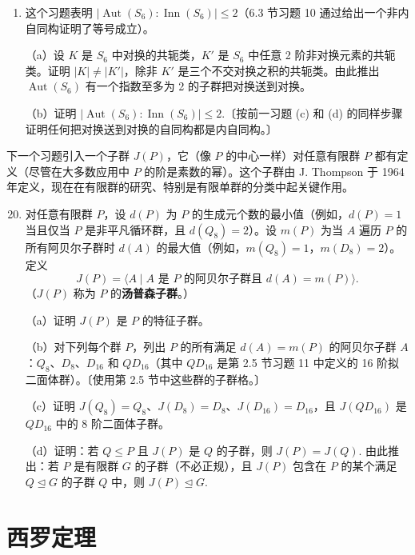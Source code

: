 \begin{enumerate}
\item 这个习题表明 \(|\operatorname{Aut}(S_6) : \operatorname{Inn}(S_6)| \leq 2\)（6.3 节习题 10 通过给出一个非内自同构证明了等号成立）。

（a）设 \(K\) 是 \(S_6\) 中对换的共轭类，\(K'\) 是 \(S_6\) 中任意 2 阶非对换元素的共轭类。证明 \(|K| \neq |K'|\)，除非 \(K'\) 是三个不交对换之积的共轭类。由此推出 \(\operatorname{Aut}(S_6)\) 有一个指数至多为 2 的子群把对换送到对换。

（b）证明 \(|\operatorname{Aut}(S_6) : \operatorname{Inn}(S_6)| \leq 2\).〔按前一习题 (c) 和 (d) 的同样步骤证明任何把对换送到对换的自同构都是内自同构。〕

\end{enumerate}

下一个习题引入一个子群 \(J(P)\)，它（像 \(P\) 的中心一样）对任意有限群 \(P\) 都有定义（尽管在大多数应用中 \(P\) 的阶是素数的幂）。这个子群由 J. Thompson 于 1964 年定义，现在在有限群的研究、特别是有限单群的分类中起关键作用。

\begin{enumerate}\setcounter{enumi}{19}

\item 对任意有限群 \(P\)，设 \(d(P)\) 为 \(P\) 的生成元个数的最小值（例如，\(d(P) = 1\) 当且仅当 \(P\) 是非平凡循环群，且 \(d(Q_8) = 2\)）。设 \(m(P)\) 为当 \(A\) 遍历 \(P\) 的所有阿贝尔子群时 \(d(A)\) 的最大值（例如，\(m(Q_8) = 1\)，\(m(D_8) = 2\)）。定义
\[
J(P) = \langle A \mid A \text{ 是 } P \text{ 的阿贝尔子群且 } d(A) = m(P) \rangle.
\]
（\(J(P)\) 称为 \(P\) 的\textbf{汤普森子群}。）

（a）证明 \(J(P)\) 是 \(P\) 的特征子群。

（b）对下列每个群 \(P\)，列出 \(P\) 的所有满足 \(d(A) = m(P)\) 的阿贝尔子群 \(A\)：\(Q_8\)、\(D_8\)、\(D_{16}\) 和 \(QD_{16}\)（其中 \(QD_{16}\) 是第 2.5 节习题 11 中定义的 16 阶拟二面体群）。〔使用第 2.5 节中这些群的子群格。〕

（c）证明 \(J(Q_8) = Q_8\)、\(J(D_8) = D_8\)、\(J(D_{16}) = D_{16}\)，且 \(J(QD_{16})\) 是 \(QD_{16}\) 中的 8 阶二面体子群。

（d）证明：若 \(Q \leq P\) 且 \(J(P)\) 是 \(Q\) 的子群，则 \(J(P) = J(Q)\). 由此推出：若 \(P\) 是有限群 \(G\) 的子群（不必正规），且 \(J(P)\) 包含在 \(P\) 的某个满足 \(Q \trianglelefteq G\) 的子群 \(Q\) 中，则 \(J(P) \trianglelefteq G\).
\end{enumerate}

\section{西罗定理}

